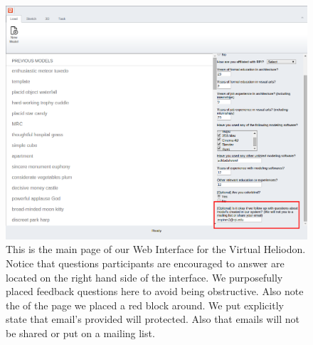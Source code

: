 \documentclass[12pt]{article}
\begin{document}
\begin{figure}[h]
\centering
\includegraphics[scale=0.4]{updated_email}
\caption{This is the main page of our Web Interface for the Virtual Heliodon. Notice that questions participants are encouraged to answer are located on the right hand side of the interface. We purposefully placed feedback questions here to avoid being obstructive. Also note the of the page we placed a red block around. We put explicitly state that email's provided will protected. Also that emails will not be shared or put on a mailing list. }
\label{fig:sfig1}
\end{figure}
\end{document}
